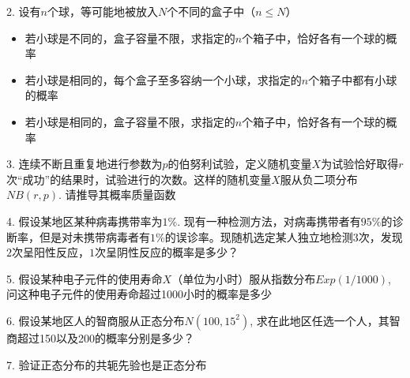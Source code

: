 \documentclass[10pt]{beamer}
\begin{document}

\begin{frame}

2. 设有$n$个球，等可能地被放入$N$个不同的盒子中（$n \le N$）
\vspace{0.6em}
\begin{itemize}
\item[(1)] 若小球是不同的，盒子容量不限，求指定的$n$个箱子中，恰好各有一个球的概率
\vspace{0.4em}
\item[(2)] 若小球是相同的，每个盒子至多容纳一个小球，求指定的$n$个箱子中都有小球的概率
\vspace{0.4em}
\item[(3)] 若小球是相同的，盒子容量不限，求指定的$n$个箱子中，恰好各有一个球的概率
\end{itemize}

\vspace{1em}

3. 连续不断且重复地进行参数为$p$的伯努利试验，定义随机变量$X$为试验恰好取得$r$次``成功''的结果时，试验进行的次数。这样的随机变量$X$服从负二项分布$NB(r,p)$. 请推导其概率质量函数

\end{frame}


\begin{frame}

4. 假设某地区某种病毒携带率为$1\%$. 现有一种检测方法，对病毒携带者有$95\%$的诊断率，但是对未携带病毒者有$1\%$的误诊率。现随机选定某人独立地检测$3$次，发现$2$次呈阳性反应，$1$次呈阴性反应的概率是多少？

\vspace{1em}

5. 假设某种电子元件的使用寿命$X$（单位为小时）服从指数分布$Exp(1/1000)$, 问这种电子元件的使用寿命超过1000小时的概率是多少

\vspace{1em}

6. 假设某地区人的智商服从正态分布$N(100, 15^2)$, 求在此地区任选一个人，其智商超过150以及200的概率分别是多少？

\vspace{1em}

7. 验证正态分布的共轭先验也是正态分布

\end{frame}

\end{document}

